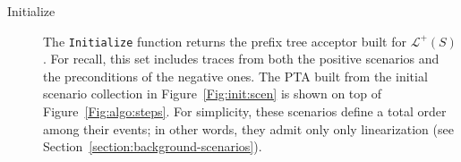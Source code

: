 \begin{description}

\item[Initialize] The \texttt{Initialize} function returns the prefix tree acceptor built for $\mathcal{L}^+(S)$. For recall, this set includes traces from both the positive scenarios and the preconditions of the negative ones. The PTA built from the initial scenario collection in Figure~\ref{Fig:init:scen} is shown on top of Figure~\ref{Fig:algo:steps}. For simplicity, these scenarios define a total order among their events; in other words, they admit only only linearization (see Section~\ref{section:background-scenarios}). 

\begin{figure}
\centering
{}

\end{figure}
\end{description}
